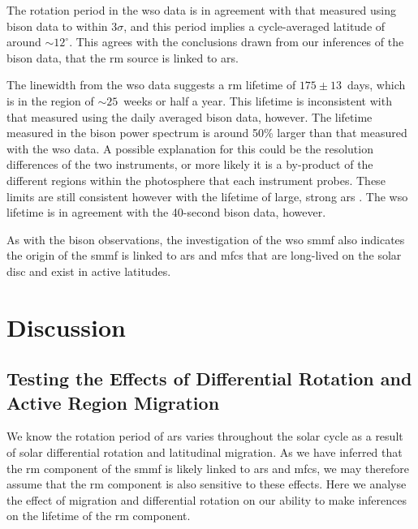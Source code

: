 The rotation period in the \gls{wso} data is in agreement with that measured using \gls{bison} data to within 3$\sigma$, and this period implies a cycle-averaged latitude of around $\sim12^{\circ}$. This agrees with the conclusions drawn from our inferences of the \gls{bison} data, that the \gls{rm} source is linked to \glspl{ar}.


The linewidth from the \gls{wso} data suggests a \gls{rm} lifetime of $175 \pm 13$~days, which is in the region of $\sim 25$~weeks or half a year. This lifetime is inconsistent with that measured using the daily averaged \gls{bison} data, however. The lifetime measured in the \gls{bison} power spectrum is around 50\% larger than that measured with the \gls{wso} data. A possible explanation for this could be the resolution differences of the two instruments, or more likely it is a by-product of the different regions within the photosphere that each instrument probes. These limits are still consistent however with the lifetime of large, strong \glspl{ar} \citep{schrijver_photospheric_1994, van_driel-gesztelyi_evolution_2015}. The \gls{wso} lifetime is in agreement with the 40-second \gls{bison} data, however.

As with the \gls{bison} observations, the investigation of the \gls{wso} \gls{smmf} also indicates the origin of the \gls{smmf} is linked to \glspl{ar} and \glspl{mfc} that are long-lived on the solar disc and exist in active latitudes.



\section{Discussion}\label{sec:SMMF_artificial}



\subsection{Testing the Effects of Differential Rotation and Active Region Migration}
\label{sec:smearing}

We know the rotation period of \glspl{ar} varies throughout the solar cycle as a result of solar differential rotation and latitudinal migration. As we have inferred that the \gls{rm} component of the \gls{smmf} is likely linked to \glspl{ar} and \glspl{mfc}, we may therefore assume that the \gls{rm} component is also sensitive to these effects. Here we analyse the effect of migration and differential rotation on our ability to make inferences on the lifetime of the \gls{rm} component.

